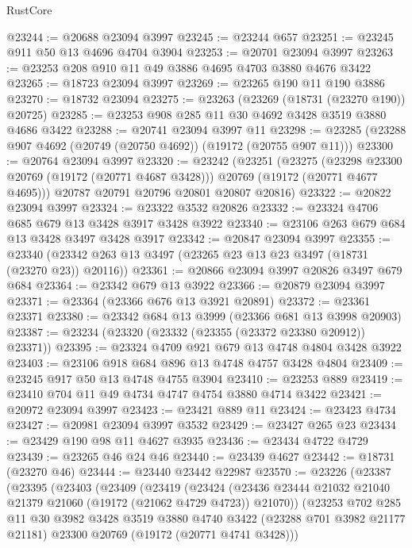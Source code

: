 \begin{lexlean}{RustCore}
\begin{coremodule}
@23244 := @20688 @23094 @3997
@23245 := @23244 @657
@23251 := @23245 @911 @50 @13 @4696 @4704 @3904
@23253 := @20701 @23094 @3997
@23263 := @23253 @208 @910 @11 @49 @3886 @4695 @4703 @3880 @4676 @3422
@23265 := @18723 @23094 @3997
@23269 := @23265 @190 @11 @190 @3886
@23270 := @18732 @23094
@23275 := @23263 (@23269 (@18731 (@23270 @190)) @20725)
@23285 := @23253 @908 @285 @11 @30 @4692 @3428 @3519 @3880 @4686 @3422
@23288 := @20741 @23094 @3997 @11
@23298 := @23285 (@23288 @907 @4692 (@20749 (@20750 @4692)) (@19172 (@20755 @907 @11)))
@23300 := @20764 @23094 @3997
@23320 := @23242
    (@23251
      (@23275
        (@23298 @23300 @20769 (@19172 (@20771 @4687 @3428)))
        @20769
        (@19172 (@20771 @4677 @4695)))
      @20787
      @20791
      @20796
      @20801
      @20807
      @20816)
@23322 := @20822 @23094 @3997
@23324 := @23322 @3532 @20826
@23332 := @23324 @4706 @685 @679 @13 @3428 @3917 @3428 @3922
@23340 := @23106 @263 @679 @684 @13 @3428 @3497 @3428 @3917
@23342 := @20847 @23094 @3997
@23355 := @23340 (@23342 @263 @13 @3497 (@23265 @23 @13 @23 @3497 (@18731 (@23270 @23)) @20116))
@23361 := @20866 @23094 @3997 @20826 @3497 @679 @684
@23364 := @23342 @679 @13 @3922
@23366 := @20879 @23094 @3997
@23371 := @23364 (@23366 @676 @13 @3921 @20891)
@23372 := @23361 @23371
@23380 := @23342 @684 @13 @3999 (@23366 @681 @13 @3998 @20903)
@23387 := @23234 (@23320 (@23332 (@23355 (@23372 @23380 @20912)) @23371))
@23395 := @23324 @4709 @921 @679 @13 @4748 @4804 @3428 @3922
@23403 := @23106 @918 @684 @896 @13 @4748 @4757 @3428 @4804
@23409 := @23245 @917 @50 @13 @4748 @4755 @3904
@23410 := @23253 @889
@23419 := @23410 @704 @11 @49 @4734 @4747 @4754 @3880 @4714 @3422
@23421 := @20972 @23094 @3997
@23423 := @23421 @889 @11
@23424 := @23423 @4734
@23427 := @20981 @23094 @3997 @3532
@23429 := @23427 @265 @23
@23434 := @23429 @190 @98 @11 @4627 @3935
@23436 := @23434 @4722 @4729
@23439 := @23265 @46 @24 @46
@23440 := @23439 @4627
@23442 := @18731 (@23270 @46)
@23444 := @23440 @23442 @22987
@23570 := @23226
    (@23387
      (@23395
        (@23403
          (@23409
            (@23419
              (@23424
                (@23436 @23444 @21032 @21040 @21379 @21060 (@19172 (@21062 @4729 @4723)) @21070))
              (@23253
                @702
                @285
                @11
                @30
                @3982
                @3428
                @3519
                @3880
                @4740
                @3422
                (@23288 @701 @3982 @21177 @21181)
                @23300
                @20769
                (@19172 (@20771 @4741 @3428)))

\end{coremodule}
\end{lexlean}
